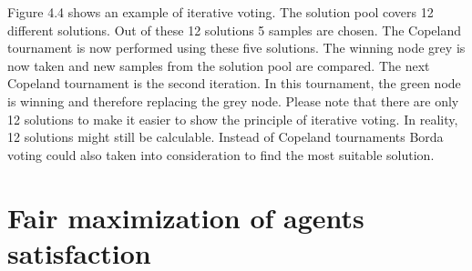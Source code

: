 \documentclass[german, a4paper, 11pt, oneside]{scrbook}
\begin{document}
Figure 4.4 shows an example of iterative voting. The solution pool covers 12 different solutions. Out of these 12 solutions 5 samples are chosen. The Copeland tournament is now performed using these five solutions. The winning node grey is now taken and new samples from the solution pool are compared. The next Copeland tournament is the second iteration. In this tournament, the green node is winning and therefore replacing the grey node. Please note that there are only 12 solutions to make it easier to show the principle of iterative voting. In reality, 12 solutions might still be calculable. Instead of Copeland tournaments Borda voting could also taken into consideration to find the most suitable solution.











\section{Fair maximization of agents satisfaction}
\end{document}
